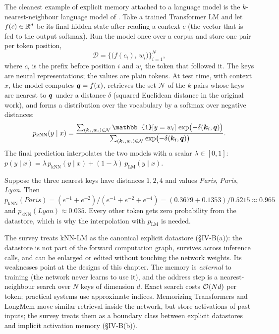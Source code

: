 The cleanest example of explicit memory attached to a language model is the $k$-nearest-neighbour
language model of \citet{khandelwal2020knnlm}. Take a trained Transformer LM and let
$f(c) \in \mathbb{R}^{d}$ be its final hidden state after reading a context $c$ (the vector that is fed to
the output softmax). Run the model once over a corpus and store one pair per token position,
\begin{equation}
  \mathcal{D} = \bigl\{ \bigl(f(c_i),\, w_i\bigr) \bigr\}_{i=1}^{N},
  \label{eq:c10-datastore}
\end{equation}
where $c_i$ is the prefix before position $i$ and $w_i$ the token that followed it. The keys are
neural representations; the values are plain tokens. At test time, with context $x$, the model
computes $\bm{q} = f(x)$, retrieves the set $\mathcal{N}$ of the $k$ pairs whose keys are nearest to
$\bm{q}$ under a distance $\delta$ (squared Euclidean distance in the original work), and forms a
distribution over the vocabulary by a softmax over negative distances:
\begin{equation}
  p_{\mathrm{kNN}}(y \mid x) = \frac{\sum_{(\vk_i, w_i) \in \mathcal{N}} \mathbb{1}[y = w_i]\,
  \exp\bigl(-\delta(\vk_i, \vq)\bigr)}{\sum_{(\vk_i, w_i) \in \mathcal{N}}
  \exp\bigl(-\delta(\vk_i, \vq)\bigr)} .
  \label{eq:c10-knn}
\end{equation}
The final prediction interpolates the two models with a scalar $\lambda \in [0,1]$:
$p(y \mid x) = \lambda\, p_{\mathrm{kNN}}(y \mid x) + (1-\lambda)\, p_{\mathrm{LM}}(y \mid x)$.

\begin{example}
Suppose the three nearest keys have distances $1, 2, 4$ and values \emph{Paris}, \emph{Paris},
\emph{Lyon}. Then $p_{\mathrm{kNN}}(\textit{Paris}) = (e^{-1}+e^{-2})/(e^{-1}+e^{-2}+e^{-4})
= (0.3679 + 0.1353)/0.5215 \approx 0.965$ and $p_{\mathrm{kNN}}(\textit{Lyon}) \approx 0.035$.
Every other token gets zero probability from the datastore, which is why the interpolation with
$p_{\mathrm{LM}}$ is needed.
\end{example}

The survey treats kNN-LM as the canonical explicit datastore (\S IV-B(a)): the datastore is not
part of the forward computation graph, survives across inference calls, and can be enlarged or
edited without touching the network weights. Its weaknesses point at the designs of this chapter.
The memory is \emph{external} to training (the network never learns to use it), and the address
step is a nearest-neighbour search over $N$ keys of dimension $d$. Exact search costs
$\mathcal{O}(Nd)$ per token; practical systems use approximate indices. Memorizing Transformers
\citep{wu2022memorizing} and LongMem \citep{wang2023longmem} move similar retrieval inside the
network, but store activations of past inputs; the survey treats them as a boundary class between
explicit datastores and implicit activation memory (\S IV-B(b)).

